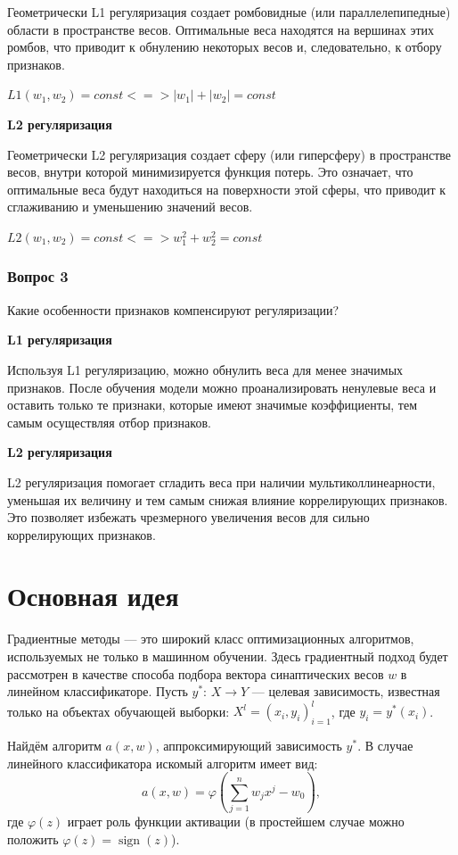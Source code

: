 \noindent Геометрически L1 регуляризация создает ромбовидные (или параллелепипедные) области в пространстве весов. Оптимальные веса находятся на вершинах этих ромбов, что приводит к обнулению некоторых весов и, следовательно, к отбору признаков.

$L1(w_1,w_2) = const <=> |w_1|+|w_2| = const$

\textbf{L2 регуляризация}

\noindent Геометрически L2 регуляризация создает сферу (или гиперсферу) в пространстве весов, внутри которой минимизируется функция потерь. Это означает, что оптимальные веса будут находиться на поверхности этой сферы, что приводит к сглаживанию и уменьшению значений весов.

$L2(w_1,w_2) = const <=> w_1^2+w_2^2 = const$

\subsubsection{Вопрос 3}
\noindent Какие особенности признаков компенсируют регуляризации?

\textbf{L1 регуляризация}

\noindent Используя L1 регуляризацию, можно обнулить веса для менее значимых признаков. После обучения модели можно проанализировать ненулевые веса и оставить только те признаки, которые имеют значимые коэффициенты, тем самым осуществляя отбор признаков.

\textbf{L2 регуляризация}

\noindent L2 регуляризация помогает сгладить веса при наличии мультиколлинеарности, уменьшая их величину и тем самым снижая влияние коррелирующих признаков. Это позволяет избежать чрезмерного увеличения весов для сильно коррелирующих признаков.

\section*{Основная идея}

Градиентные методы --- это широкий класс оптимизационных алгоритмов, используемых не только в машинном обучении. Здесь градиентный подход будет рассмотрен в качестве способа подбора вектора синаптических весов \( w \) в линейном классификаторе. Пусть \( y^*: \, X \to Y \) — целевая зависимость, известная только на объектах обучающей выборки: \( X^l = (x_i, y_i)_{i=1}^l \), где \( y_i = y^*(x_i) \).

Найдём алгоритм \( a(x, w) \), аппроксимирующий зависимость \( y^* \). В случае линейного классификатора искомый алгоритм имеет вид:
$$ a(x, w) = \varphi\left(\sum_{j=1}^n w_j x^j - w_0\right), $$
где \( \varphi(z) \) играет роль функции активации (в простейшем случае можно положить \( \varphi(z) = \operatorname{sign}(z) \)).

